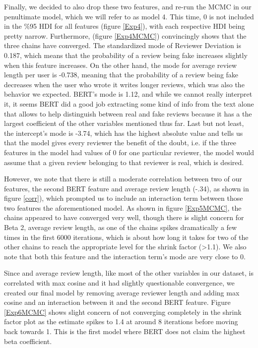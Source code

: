 \documentclass[man, floatsintext, 10pt]{apa6}
\begin{document}
Finally, we decided to also drop these two features, and re-run the MCMC in our penultimate model, which we will refer to as model 4. This time,  0 is not included in the \%95 HDI for all features (figure \ref{Exp4}), with each respective HDI being pretty narrow. Furthermore, (figure \ref{Exp4MCMC}) convincingly shows that the three chains have converged.  The standardized  mode of Reviewer Deviation is 0.187, which means that the probability of a review being fake increases slightly when this feature increases. On the other hand, the mode for average review length per user is -0.738, meaning that the probability of a review being fake decreases when the user who wrote it writes longer reviews, which was also the behavior we expected. BERT's mode is 1.12, and while we cannot really interpret it, it seems BERT did a good job extracting some kind of info from the text alone that allows to help distinguish between real and fake reviews because it has a the largest coefficient of the other variables mentioned thus far. Last but not least, the intercept's mode is -3.74, which has the highest absolute value and tells us that the model gives every reviewer the benefit of the doubt, i.e. if the three features in the model had values of 0 for one particular reviewer, the model would assume that a given review belonging to that reviewer is real, which is desired.

However, we note that there is still a moderate correlation between two of our features, the second BERT feature and average review length (-.34), as shown in figure \ref{corr}), which prompted us to include an interaction term between those two features the aforementioned model. As shown in figure \ref{Exp5MCMC}, the chains appeared to have converged very well, though there is slight concern for Beta 2, average review length, as one of the chains spikes dramatically a few times in the first 6000 iterations, which is about how long it takes for two of the other chains to reach the appropriate level for the shrink factor (>1.1). We also note that both this feature and the interaction term's mode are very close to 0.

Since and average review length, like most of the other variables in our dataset, is correlated with max cosine and it had slightly questionable convergence, we created our final model by removing average reviewer length and adding max cosine and an interaction between it and the second BERT feature. Figure \ref{Exp6MCMC} shows slight concern of not converging completely in the shrink factor plot as the estimate spikes to 1.4 at around 8 iterations before moving back towards 1. This is the first model where BERT does not claim the highest beta coefficient. 
\vspace{2mm}
\end{document}
